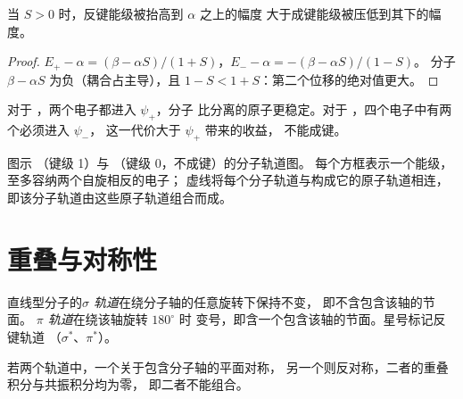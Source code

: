 \begin{proposition}[反键轨道升高得更多]\label{prop:b2:diatomic-mos:asymmetry}
当 $S > 0$ 时，反键能级被抬高到 $\alpha$ 之上的幅度
大于成键能级被压低到其下的幅度。
\end{proposition}

\begin{proof}
$E_+ - \alpha = (\beta - \alpha S)/(1 + S)$，$E_- - \alpha = -(\beta - \alpha S)/(1 - S)$。
分子 $\beta - \alpha S$ 为负（耦合占主导），且 $1 - S < 1
+ S$：第二个位移的绝对值更大。
\end{proof}

对于 ，两个电子都进入 $\psi_+$，分子
比分离的原子更稳定。对于 ，四个电子中有两个必须进入 $\psi_-$，
这一代价大于 $\psi_+$ 带来的收益， 不能成键。

\begin{omfigure}
\begin{MOdiagram}
\end{MOdiagram}
\hspace{1.5cm}
\begin{MOdiagram}
\end{MOdiagram}

{\small 图示 （键级 1）与 （键级 0，不成键）的分子轨道图。
每个方框表示一个能级，至多容纳两个自旋相反的电子；
虚线将每个分子轨道与构成它的原子轨道相连，
即该分子轨道由这些原子轨道组合而成。}
\end{omfigure}

\section{重叠与对称性}

\begin{definition}\label{def:b2:diatomic-mos:sigma-pi}
直线型分子的\emph{$\sigma$ 轨道}在绕分子轴的任意旋转下保持不变，
即不含包含该轴的节面。
\emph{$\pi$ 轨道}在绕该轴旋转 $180^\circ$ 时
变号，即含一个包含该轴的节面。星号标记反键轨道
（$\sigma^*$、$\pi^*$）。
\end{definition}

\begin{proposition}[对称性引起的零重叠]\label{prop:b2:diatomic-mos:symmetry}
若两个轨道中，一个关于包含分子轴的平面对称，
另一个则反对称，二者的重叠积分与共振积分均为零，
即二者不能组合。
\end{proposition}

